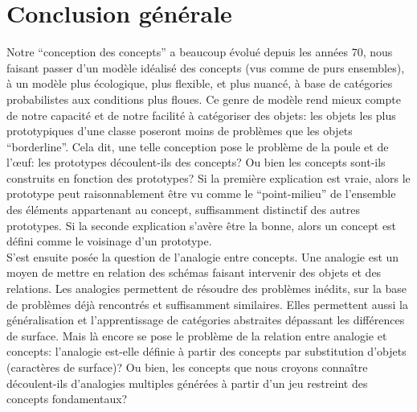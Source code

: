 \documentclass[french]{article}
\begin{document}
\section*{Conclusion générale}
	Notre ``conception des concepts'' a beaucoup évolué depuis les années 70, nous faisant passer d'un modèle idéalisé des concepts (vus comme de purs ensembles), à un modèle plus écologique, plus flexible, et plus nuancé, à base de catégories probabilistes aux conditions plus floues. Ce genre de modèle rend mieux compte de notre capacité et de notre facilité à catégoriser des objets: les objets les plus prototypiques d'une classe poseront moins de problèmes que les objets ``borderline''. Cela dit, une telle conception pose le problème de la poule et de l'œuf: les prototypes découlent-ils des concepts? Ou bien les concepts sont-ils construits en fonction des prototypes? Si la première explication est vraie, alors le prototype peut raisonnablement être vu comme le ``point-milieu'' de l'ensemble des éléments appartenant au concept, suffisamment distinctif des autres prototypes. Si la seconde explication s'avère être la bonne, alors un concept est défini comme le voisinage d'un prototype.\\
	S'est ensuite posée la question de l'analogie entre concepts. Une analogie est un moyen de mettre en relation des schémas faisant intervenir des objets et des relations. Les analogies permettent de résoudre des problèmes inédits, sur la base de problèmes déjà rencontrés et suffisamment similaires. Elles permettent aussi la généralisation et l'apprentissage de catégories abstraites dépassant les différences de surface. Mais là encore se pose le problème de la relation entre analogie et concepts: l'analogie est-elle définie à partir des concepts par substitution d'objets (caractères de surface)? Ou bien, les concepts que nous croyons connaître découlent-ils d'analogies multiples générées à partir d'un jeu restreint des concepts fondamentaux?\\
	
\end{document}
